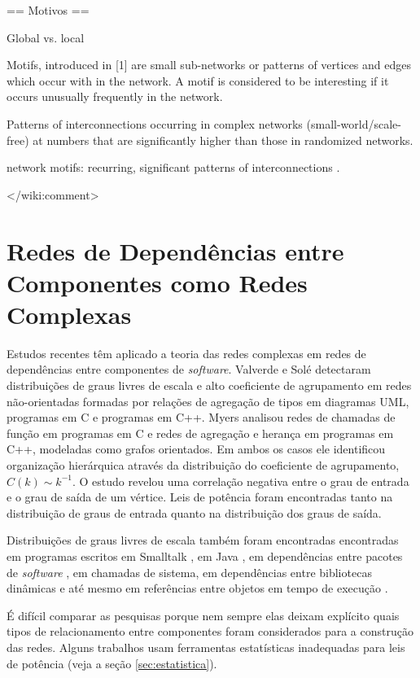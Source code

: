 \documentclass{article}
\begin{document}
	== Motivos ==

	Global vs. local

	Motifs,
	introduced in [1] are small sub-networks or patterns of
	vertices and edges which occur with in the network. A
	motif is considered to be interesting if it occurs unusually
	frequently in the network.

	Patterns of interconnections occurring in
	complex networks (small-world/scale-
	free) at numbers that are significantly
	higher than those in randomized
	networks.

	network motifs: recurring, significant patterns of interconnections \cite{Milo2002}.

</wiki:comment>

\section{Redes de Dependências entre Componentes como Redes Complexas}

Estudos recentes têm aplicado a teoria das redes complexas em redes de dependências entre componentes de \textit{software}. Valverde e Solé \cite{Valverde2003} detectaram distribuições de graus livres de escala e alto coeficiente de agrupamento em redes não-orientadas formadas por relações de agregação de tipos em diagramas UML, programas em C e programas em C++. Myers \cite{Myers2003} analisou redes de chamadas de função em programas em C e redes de agregação e herança em programas em C++, modeladas como grafos orientados. Em ambos os casos ele identificou organização hierárquica através da distribuição do coeficiente de agrupamento, $C(k) \sim k^{-1}$. O estudo revelou uma correlação negativa entre o grau de entrada e o grau de saída de um vértice. Leis de potência foram encontradas tanto na distribuição de graus de entrada quanto na distribuição dos graus de saída.

Distribuições de graus livres de escala também foram encontradas encontradas em programas escritos em Smalltalk \cite{Marchesi2004,Concas2007}, em Java \cite{Hyland-Wood2006,Baxter2006,Ichii2008}, em dependências entre pacotes de \textit{software} \cite{Labelle2004}, em chamadas de sistema, em dependências entre bibliotecas dinâmicas \cite{Louridas2008} e até mesmo em referências entre objetos em tempo de execução \cite{Potanin2005}.

É difícil comparar as pesquisas porque nem sempre elas deixam explícito quais tipos de relacionamento entre componentes foram considerados para a construção das redes. Alguns trabalhos usam ferramentas estatísticas inadequadas para leis de potência (veja a seção \ref{sec:estatistica}).
\end{document}
